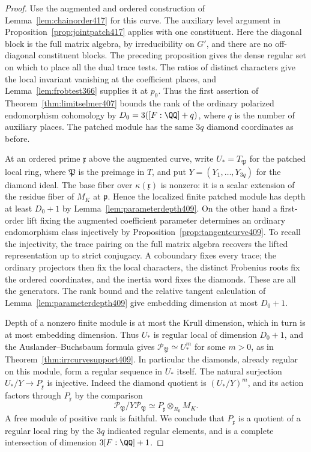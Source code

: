 \documentclass[a4paper,11pt]{article}
\theoremstyle{definition}
\theoremstyle{remark}
\numberwithin{equation}{section}
\begin{document}
\begin{proof}
Use the augmented and ordered construction of
Lemma~\ref{lem:chainorder417} for this curve. The auxiliary
level argument in Proposition~\ref{prop:jointpatch417} applies
with one constituent. Here the diagonal block is the full
matrix algebra, by irreducibility on \(G'\), and there are
no off-diagonal constituent blocks. The preceding proposition
gives the dense regular set on which to place all the dual
trace tests. The ratios of distinct characters give the local
invariant vanishing at the coefficient places, and
Lemma~\ref{lem:frobtest366} supplies it at \(p_0\).
Thus the first assertion of Theorem~\ref{thm:limitselmer407}
bounds the rank of the ordinary polarized endomorphism
cohomology by \(D_0=3([F:\QQ]+q)\), where \(q\) is the
number of auxiliary places. The patched module has the
same \(3q\) diamond coordinates as before.

At an ordered prime \(\mathfrak x\) above the augmented curve,
write \(U_*=T_{\mathfrak P}\) for the patched local ring,
where \(\mathfrak P\) is the preimage in \(T\), and put
\(Y=(Y_1,\ldots,Y_{3q})\) for the diamond ideal.
The base fiber over \(\kappa(\mathfrak x)\) is nonzero:
it is a scalar extension of the residue fiber of \(M_K\)
at \(\mathfrak p\). Hence the localized finite patched module
has depth at least \(D_0+1\) by
Lemma~\ref{lem:parameterdepth409}. On the other hand a
first-order lift fixing the augmented coefficient parameter
determines an ordinary endomorphism class injectively by
Proposition~\ref{prop:tangentcurve409}. To recall the
injectivity, the trace pairing on the full matrix algebra
recovers the lifted representation up to strict conjugacy.
A coboundary fixes every trace; the ordinary projectors
then fix the local characters, the distinct Frobenius roots
fix the ordered coordinates, and the inertia word fixes
the diamonds. These are all the generators. The rank bound
and the relative tangent calculation of
Lemma~\ref{lem:parameterdepth409} give embedding dimension
at most \(D_0+1\).

Depth of a nonzero finite module is at most the Krull
dimension, which in turn is at most embedding dimension.
Thus \(U_*\) is regular local of dimension \(D_0+1\), and
the Auslander--Buchsbaum formula gives
\(\mathcal P_{\mathfrak P}\simeq U_*^m\) for some \(m>0\),
as in Theorem~\ref{thm:irrcurvesupport409}.
In particular the diamonds, already regular on this module,
form a regular sequence in \(U_*\) itself. The natural
surjection \(U_*/Y\to P_{\mathfrak x}\) is injective.
Indeed the diamond quotient is \((U_*/Y)^m\), and its action
factors through \(P_{\mathfrak x}\) by the comparison
\[
       \mathcal P_{\mathfrak P}/Y\mathcal P_{\mathfrak P}
                     \simeq P_{\mathfrak x}\otimes_{R_0}M_K .
\]
A free module of positive rank is faithful. We conclude that
\(P_{\mathfrak x}\) is a quotient of a regular local ring
by the \(3q\) indicated regular elements, and is a complete
intersection of dimension \(3[F:\QQ]+1\).


\end{proof}
\end{document}
